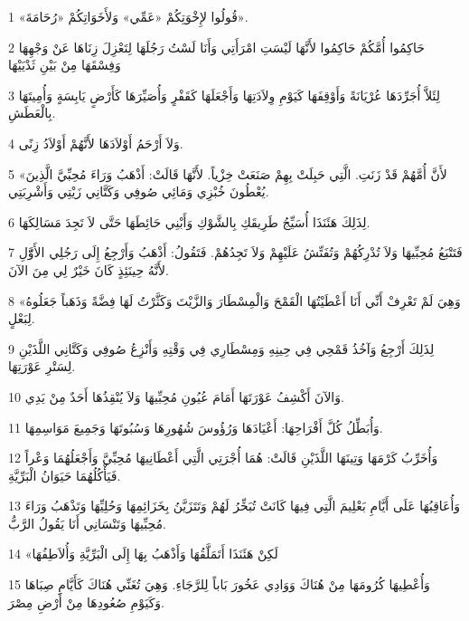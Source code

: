 \par 1 «قُولُوا لإِخْوَتِكُمْ «عَمِّي» وَلأَخَوَاتِكُمْ «رُحَامَةَ».
\par 2 حَاكِمُوا أُمَّكُمْ حَاكِمُوا لأَنَّهَا لَيْسَتِ امْرَأَتِي وَأَنَا لَسْتُ رَجُلَهَا لِتَعْزِلَ زِنَاهَا عَنْ وَجْهِهَا وَفِسْقَهَا مِنْ بَيْنِ ثَدْيَيْهَا
\par 3 لِئَلاَّ أُجَرِّدَهَا عُرْيَانَةً وَأَوْقِفَهَا كَيَوْمِ وِلاَدَتِهَا وَأَجْعَلَهَا كَقَفْرٍ وَأُصَيِّرَهَا كَأَرْضٍ يَابِسَةٍ وَأُمِيتَهَا بِالْعَطَشِ.
\par 4 وَلاَ أَرْحَمُ أَوْلاَدَهَا لأَنَّهُمْ أَوْلاَدُ زِنًى.
\par 5 «لأَنَّ أُمَّهُمْ قَدْ زَنَتِ. الَّتِي حَبِلَتْ بِهِمْ صَنَعَتْ خِزْياً. لأَنَّهَا قَالَتْ: أَذْهَبُ وَرَاءَ مُحِبِّيَّ الَّذِينَ يُعْطُونَ خُبْزِي وَمَائِي صُوفِي وَكَتَّانِي زَيْتِي وَأَشْرِبَتِي.
\par 6 لِذَلِكَ هَئَنَذَا أُسَيِّجُ طَرِيقَكِ بِالشَّوْكِ وَأَبْنِي حَائِطَهَا حَتَّى لاَ تَجِدَ مَسَالِكَهَا.
\par 7 فَتَتْبَعُ مُحِبِّيهَا وَلاَ تُدْرِكُهُمْ وَتُفَتِّشُ عَلَيْهِمْ وَلاَ تَجِدُهُمْ. فَتَقُولُ: أَذْهَبُ وَأَرْجِعُ إِلَى رَجُلِي الأَوَّّلِ لأَنَّهُ حِينَئِذٍ كَانَ خَيْرٌ لِي مِنَ الآنَ.
\par 8 «وَهِيَ لَمْ تَعْرِفْ أَنِّي أَنَا أَعْطَيْتُهَا الْقَمْحَ وَالْمِسْطَارَ وَالزَّيْتَ وَكَثَّرْتُ لَهَا فِضَّةً وَذَهَباً جَعَلُوهُ لِبَعْلٍ.
\par 9 لِذَلِكَ أَرْجِعُ وَآخُذُ قَمْحِي فِي حِينِهِ وَمِسْطَارِي فِي وَقْتِهِ وَأَنْزِعُ صُوفِي وَكَتَّانِي اللَّذَيْنِ لِسَتْرِ عَوْرَتِهَا.
\par 10 وَالآنَ أَكْشِفُ عَوْرَتَهَا أَمَامَ عُيُونِ مُحِبِّيهَا وَلاَ يُنْقِذُهَا أَحَدٌ مِنْ يَدِي.
\par 11 وَأُبَطِّلُ كُلَّ أَفْرَاحِهَا: أَعْيَادَهَا وَرُؤُوسَ شُهُورِهَا وَسُبُوتَهَا وَجَمِيعَ مَوَاسِمِهَا.
\par 12 وَأُخَرِّبُ كَرْمَهَا وَتِينَهَا اللَّذَيْنِ قَالَتْ: هُمَا أُجْرَتِي الَّتِي أَعْطَانِيهَا مُحِبِّيَّ وَأَجْعَلُهُمَا وَعْراً فَيَأْكُلُهُمَا حَيَوَانُ الْبَرِّيَّةِ.
\par 13 وَأُعَاقِبُهَا عَلَى أَيَّامِ بَعْلِيمَ الَّتِي فِيهَا كَانَتْ تُبَخِّرُ لَهُمْ وَتَتَزَيَّنُ بِخَزَائِمِهَا وَحُلِيِّهَا وَتَذْهَبُ وَرَاءَ مُحِبِّيهَا وَتَنْسَانِي أَنَا يَقُولُ الرَّبُّ.
\par 14 «لَكِنْ هَئَنَذَا أَتَمَلَّقُهَا وَأَذْهَبُ بِهَا إِلَى الْبَرِّيَّةِ وَأُلاَطِفُهَا
\par 15 وَأُعْطِيهَا كُرُومَهَا مِنْ هُنَاكَ وَوَادِي عَخُورَ بَاباً لِلرَّجَاءِ. وَهِيَ تُغَنِّي هُنَاكَ كَأَيَّامِ صِبَاهَا وَكَيَوْمِ صُعُودِهَا مِنْ أَرْضِ مِصْرَ.
